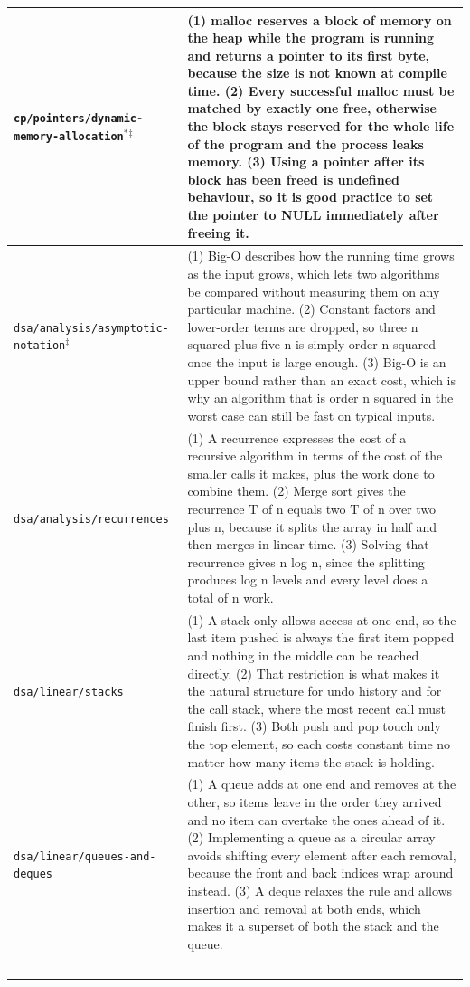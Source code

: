 \documentclass[pdflatex,sn-mathphys-num]{sn-jnl}%
\theoremstyle{thmstyleone}%
\theoremstyle{thmstyletwo}%
\theoremstyle{thmstylethree}%
\begin{document}
\begin{appendices}
\begin{longtable}{p{}p{}}
\texttt{cp/pointers/dynamic-memory-allocation}$^{*}$$^{\ddagger}$ & (1) malloc reserves a block of memory on the heap while the program is running and returns a pointer to its first byte, because the size is not known at compile time. (2) Every successful malloc must be matched by exactly one free, otherwise the block stays reserved for the whole life of the program and the process leaks memory. (3) Using a pointer after its block has been freed is undefined behaviour, so it is good practice to set the pointer to NULL immediately after freeing it. \\ \midrule
\texttt{dsa/analysis/asymptotic-notation}$^{\ddagger}$ & (1) Big-O describes how the running time grows as the input grows, which lets two algorithms be compared without measuring them on any particular machine. (2) Constant factors and lower-order terms are dropped, so three n squared plus five n is simply order n squared once the input is large enough. (3) Big-O is an upper bound rather than an exact cost, which is why an algorithm that is order n squared in the worst case can still be fast on typical inputs. \\ \midrule
\texttt{dsa/analysis/recurrences} & (1) A recurrence expresses the cost of a recursive algorithm in terms of the cost of the smaller calls it makes, plus the work done to combine them. (2) Merge sort gives the recurrence T of n equals two T of n over two plus n, because it splits the array in half and then merges in linear time. (3) Solving that recurrence gives n log n, since the splitting produces log n levels and every level does a total of n work. \\ \midrule
\texttt{dsa/linear/stacks} & (1) A stack only allows access at one end, so the last item pushed is always the first item popped and nothing in the middle can be reached directly. (2) That restriction is what makes it the natural structure for undo history and for the call stack, where the most recent call must finish first. (3) Both push and pop touch only the top element, so each costs constant time no matter how many items the stack is holding. \\ \midrule
\texttt{dsa/linear/queues-and-deques} & (1) A queue adds at one end and removes at the other, so items leave in the order they arrived and no item can overtake the ones ahead of it. (2) Implementing a queue as a circular array avoids shifting every element after each removal, because the front and back indices wrap around instead. (3) A deque relaxes the rule and allows insertion and removal at both ends, which makes it a superset of both the stack and the queue. \\ \midrule
$$
\end{longtable}
\end{appendices}
\end{document}
